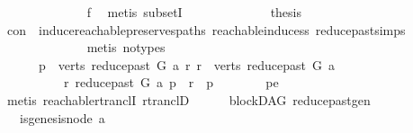 \begin{isabellebody}
\ \ \ \ \ \ \ \ \ \ \ \ \isamarkupfalse%
\ f{}\ \isamarkupfalse%
\ {\isacharparenleft}{\kern0pt}metis\ subsetI{\isacharparenright}{\kern0pt}\isanewline
\ \ \ \ \ \ \ \ \ \ \isamarkupfalse%
\ \isamarkupfalse%
\ {\isacharquery}{\kern0pt}thesis\isanewline
\ \ \ \ \ \ \ \ \ \ \ \ \isamarkupfalse%
\ con\ \ induce{\isacharunderscore}{\kern0pt}reachable{\isacharunderscore}{\kern0pt}preserves{\isacharunderscore}{\kern0pt}paths\ reachable{\isacharunderscore}{\kern0pt}induce{\isacharunderscore}{\kern0pt}ss\ reduce{\isacharunderscore}{\kern0pt}past{\isachardot}{\kern0pt}simps\isanewline
\ \ \ \ \ \ \ \ \ \ \ \ \isamarkupfalse%
\ {\isacharparenleft}{\kern0pt}metis\ {\isacharparenleft}{\kern0pt}no{\isacharunderscore}{\kern0pt}types{\isacharparenright}{\kern0pt}{\isacharparenright}{\kern0pt}\isanewline
\ \ \ \ \ \ \ \ \isamarkupfalse%
\isanewline
\ \ \ \ \ \ \isamarkupfalse%
\isanewline
\ \ \ \ \isamarkupfalse%
\isanewline
\ \ \ \ \isamarkupfalse%
\ \isanewline
\ \ \ \ \ \ {\isachardoublequoteopen}{\isasymexists}p\ {\isasymin}\ verts\ {\isacharparenleft}{\kern0pt}reduce{\isacharunderscore}{\kern0pt}past\ G\ a{\isacharparenright}{\kern0pt}{\isachardot}{\kern0pt}\ {\isacharparenleft}{\kern0pt}{\isasymforall}r{\isachardot}{\kern0pt}\ r\ {\isasymin}\ verts\ {\isacharparenleft}{\kern0pt}reduce{\isacharunderscore}{\kern0pt}past\ G\ a{\isacharparenright}{\kern0pt}\isanewline
\ \ \ \ \ \ \ \ \ {\isasymlongrightarrow}\ {\isacharparenleft}{\kern0pt}r\ {\isasymrightarrow}\isactrlsup {\isacharplus}{\kern0pt}\isactrlbsub reduce{\isacharunderscore}{\kern0pt}past\ G\ a\isactrlesub \ p\ {\isasymor}\ r\ {\isacharequal}{\kern0pt}\ p{\isacharparenright}{\kern0pt}{\isacharparenright}{\kern0pt}{\isachardoublequoteclose}\isanewline
\ \ \ \ \ \ \isamarkupfalse%
\ pe\isanewline
\ \ \ \ \ \ \isamarkupfalse%
\ {\isacharparenleft}{\kern0pt}metis\ reachable{\isacharunderscore}{\kern0pt}rtranclI\ rtranclD{\isacharparenright}{\kern0pt}\ \isanewline
\ \ \isamarkupfalse%
\isanewline
{}\isamarkupfalse%
%
\endisatagproof
{\isafoldproof}%
%
\isadelimproof
\isanewline
%
\endisadelimproof
\isanewline
\isanewline
\isanewline
{}\isamarkupfalse%
\ {\isacharparenleft}{\kern0pt}\ blockDAG{\isacharparenright}{\kern0pt}\ reduce{\isacharunderscore}{\kern0pt}past{\isacharunderscore}{\kern0pt}gen{\isacharcolon}{\kern0pt}\isanewline
\ \ \ {\isachardoublequoteopen}{\isasymnot}is{\isacharunderscore}{\kern0pt}genesis{\isacharunderscore}{\kern0pt}node\ a{\isachardoublequoteclose}\ \isanewline

\end{isabellebody}
